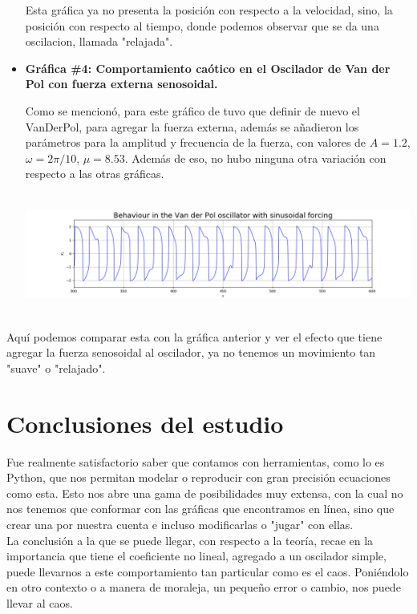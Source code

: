 \documentclass[12pt]{article}
\begin{document}
\begin{itemize}
Esta gráfica ya no presenta la posición con respecto a la velocidad, sino, la posición con respecto al tiempo, donde podemos observar que se da una oscilacion, llamada "relajada".

\item \textbf{Gráfica \#4: Comportamiento caótico en el Oscilador de Van der Pol con fuerza externa senosoidal.}

Como se mencionó, para este gráfico de tuvo que definir de nuevo el VanDerPol, para agregar la fuerza externa, además se añadieron los parámetros para la amplitud y frecuencia de la fuerza, con valores de $A=1.2$, $\omega=2\pi /10$, $\mu=8.53$. Además de eso, no hubo ninguna otra variación con respecto a las otras gráficas. 

\begin{center}
        \includegraphics[height=4cm]{Graf4.png}
\end{center}
\end{itemize}

Aquí podemos comparar esta con la gráfica anterior y ver el efecto que tiene agregar la fuerza senosoidal al oscilador, ya no tenemos un movimiento tan "suave" o "relajado". 
\section{Conclusiones del estudio}

Fue realmente satisfactorio saber que contamos con herramientas, como lo es Python, que nos permitan modelar o reproducir con gran precisión ecuaciones como esta. Esto nos abre una gama de posibilidades muy extensa, con la cual no nos tenemos que conformar con las gráficas que encontramos en línea, sino que crear una por nuestra cuenta e incluso modificarlas o "jugar" con ellas.\\ 

La conclusión a la que se puede llegar, con respecto a la teoría, recae en la importancia que tiene el coeficiente no lineal, agregado a un oscilador simple, puede llevarnos a este comportamiento tan particular como es el caos. Poniéndolo en otro contexto o a manera de moraleja, un pequeño error o cambio, nos puede llevar al caos.
\end{document}
